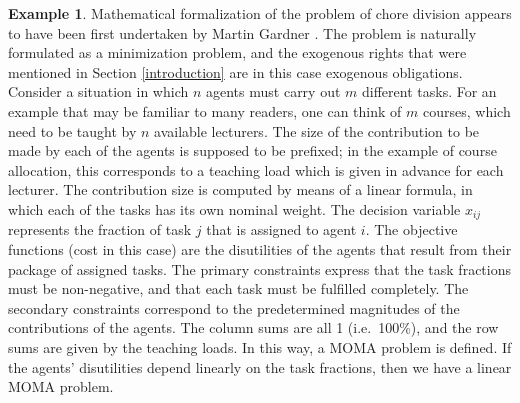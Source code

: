\documentclass{article}
\theoremstyle{definition}
\newtheorem{example}[theorem]{Example}
\begin{document}
\begin{example} \label{task}
Mathematical formalization of the problem of chore division appears to have been first undertaken by Martin Gardner \cite{Gardner}. The problem is naturally formulated as a minimization problem, and the exogenous rights that were mentioned in Section \ref{introduction} are in this case exogenous obligations. Consider a situation in which $n$ agents must carry out $m$ different tasks. For an example that may be familiar to many readers, one can think of $m$ courses, which need to be taught by $n$ available lecturers. The size of the contribution to be made by each of the agents is supposed to be prefixed; in the example of course allocation, this corresponds to a teaching load which is given in advance for each lecturer. The contribution size is computed by means of a linear formula, in which each of the tasks has its own nominal weight. The decision variable $x_{ij}$ represents the fraction of task $j$ that is assigned to agent $i$. The objective functions (cost in this case) are the disutilities of the agents that result from their package of assigned tasks. The primary constraints express that the task fractions must be non-negative, and that each task must be fulfilled completely. The secondary constraints correspond to the predetermined magnitudes of the contributions of the agents. The column sums are all 1 (i.e.\ 100\%), and the row sums are given by the teaching loads. In this way, a MOMA problem is defined. If the agents' disutilities depend linearly on the task fractions, then we have a linear MOMA problem.
\end{example}
\end{document}
